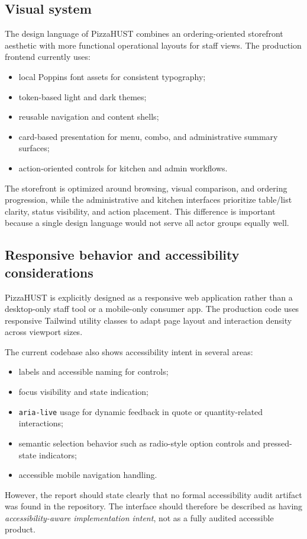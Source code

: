 \FloatBarrier

\subsection{Visual system}

The design language of PizzaHUST combines an ordering-oriented storefront aesthetic with more functional operational layouts for staff views. The production frontend currently uses:

\begin{itemize}
    \item local Poppins font assets for consistent typography;
    \item token-based light and dark themes;
    \item reusable navigation and content shells;
    \item card-based presentation for menu, combo, and administrative summary surfaces;
    \item action-oriented controls for kitchen and admin workflows.
\end{itemize}

The storefront is optimized around browsing, visual comparison, and ordering progression, while the administrative and kitchen interfaces prioritize table/list clarity, status visibility, and action placement. This difference is important because a single design language would not serve all actor groups equally well.

\subsection{Responsive behavior and accessibility considerations}

PizzaHUST is explicitly designed as a responsive web application rather than a desktop-only staff tool or a mobile-only consumer app. The production code uses responsive Tailwind utility classes to adapt page layout and interaction density across viewport sizes.

The current codebase also shows accessibility intent in several areas:

\begin{itemize}
    \item labels and accessible naming for controls;
    \item focus visibility and state indication;
    \item \texttt{aria-live} usage for dynamic feedback in quote or quantity-related interactions;
    \item semantic selection behavior such as radio-style option controls and pressed-state indicators;
    \item accessible mobile navigation handling.
\end{itemize}

However, the report should state clearly that no formal accessibility audit artifact was found in the repository. The interface should therefore be described as having \emph{accessibility-aware implementation intent}, not as a fully audited accessible product.
